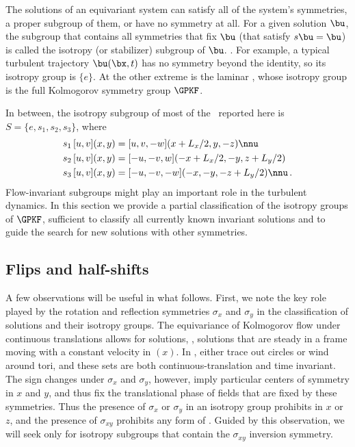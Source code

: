 \begin{description}
The solutions of an equivariant system can satisfy all of the system's
symmetries, a proper subgroup of them, or have no symmetry at all. For a
given solution $\bu$, the subgroup that contains all symmetries that fix
$\bu$ (that satisfy $s \bu = \bu$) is called the isotropy (or stabilizer)
subgroup of $\bu$. .
For example, a typical turbulent trajectory $\bu(\bx,t)$ has no symmetry
beyond the identity, so its isotropy group is $\{e\}$. At the other
extreme is the laminar {\eqv}, whose isotropy group is the full
Kolmogorov symmetry group $\GPKF$.

In between, the isotropy subgroup  of most
of the \eqva\ reported here is $S = \{e, s_1, s_2, s_3\}$, where
\begin{align}
s_1 \, [u,v](x,y) &= [u, v, -w](x+L_x/2, y, -z) \nnu \\
s_2 \, [u,v](x,y) &= [-u, -v, w](-x+L_x/2,-y,z+L_y/2) \label{shiftRot}\\
s_3 \, [u,v](x,y) &= [-u,-v,-w](-x, -y, -z+L_y/2) \nnu
\,.
\end{align}
Flow-invariant subgroups might play an important role in the turbulent
dynamics. In this section we provide a partial classification of the
isotropy groups of $\GPKF$, sufficient to classify all currently known
invariant solutions and to guide the search for new solutions with other
symmetries.


\subsection{Flips and half-shifts}
\label{s:flipnshift}

A few observations will be useful in what follows. First, we note the
key role played by the {rotation and reflection} symmetries $\sigma_x$
and $\sigma_y$  in the classification of solutions and
their isotropy groups. The equivariance of Kolmogorov flow under
continuous translations allows for {\reqva} solutions, \ie,
solutions that are steady in a frame moving with a constant velocity
in $(x)$. In {\statesp}, {\reqva} either trace out
circles or wind around tori, and these sets are both
continuous-translation and time invariant. The sign changes under
$\sigma_x$ and $\sigma_{y}$, however, imply particular
centers of symmetry in $x$ and $y$,
and thus fix the translational phase of fields that are fixed by these
symmetries. Thus the presence of $\sigma_x$ or $\sigma_y$ in an
isotropy group prohibits {\reqva} in $x$ or $z$, and the
presence of $\sigma_{xy}$ prohibits any form of {\reqv}. Guided
by this observation, we will seek {\eqva} only for isotropy subgroups
that contain the $\sigma_{xy}$ inversion symmetry.


\end{description}
